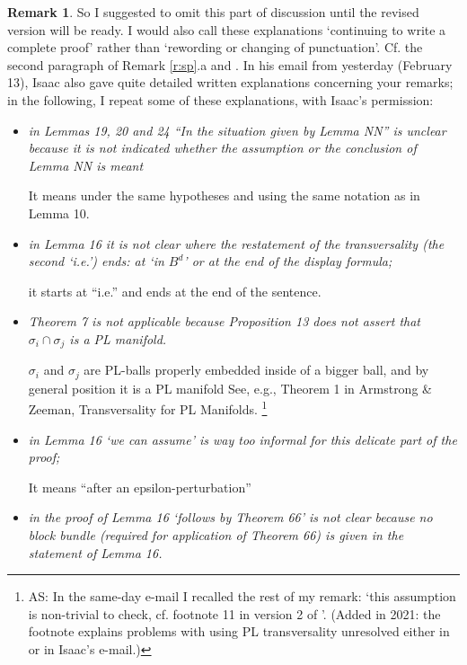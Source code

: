 \documentclass[12pt]{article}
\theoremstyle{plain}
\theoremstyle{definition}
\newtheorem{Remark}[Theorem]{Remark}
\begin{document}
{\begin{Remark}
{So I suggested to omit this part of discussion until the revised version will be ready.
\newline
I would also call these explanations `continuing to write a complete proof' rather than `rewording or changing of punctuation'.
Cf. the second paragraph of Remark \ref{r:sp}.a and \cite[Remarks 2.3.abcd]{Sk21d}.
}
In his email from yesterday (February 13), Isaac also gave quite detailed written explanations concerning your remarks; in the following, I repeat some of these explanations, with Isaac's permission:

\begin{itemize}
\item \emph{in Lemmas 19, 20 and 24 ``In the situation given by Lemma NN'' is unclear because
it is not indicated whether the assumption or the conclusion of Lemma NN is meant}

It means under the same hypotheses and using the same notation as in Lemma 10.

\item \emph{in Lemma 16 it is not clear where the restatement of the transversality (the second `i.e.') ends:
at `in $B^d$' or at the end of the display formula;}

it starts at ``i.e.'' and ends at the end of the sentence.

\item \emph{Theorem 7 is not applicable because Proposition 13 does not assert that $\sigma_i\cap \sigma_j$ is a PL manifold.}

$\sigma_i$ and $\sigma_j$ are PL-balls properly embedded inside of a bigger ball, and by general position it is a PL manifold See, e.g., Theorem 1 in Armstrong \& Zeeman, Transversality for PL Manifolds.
\footnote{AS: In the same-day e-mail I recalled the rest of my remark: `this assumption is non-trivial to check, cf. footnote 11 in version 2 of \cite{AMSW}'.
(Added in 2021: the footnote explains problems with using PL transversality unresolved either in \cite{MW16}
or in Isaac's e-mail.)}

\item \emph{in Lemma 16 `we can assume' is way too informal for this delicate part of the proof;}

It means ``after an epsilon-perturbation''

\item \emph{in the proof of Lemma 16 `follows by Theorem 66' is not clear because no block bundle
(required for application of Theorem 66) is given in the statement of Lemma 16.}


\end{itemize}
\end{Remark}}
\end{document}
